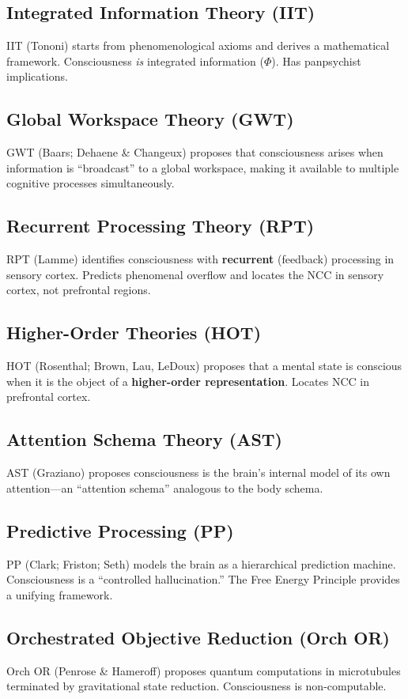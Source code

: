 \documentclass[11pt,a4paper]{report}
\begin{document}
\subsection{Integrated Information Theory (IIT)}
IIT (Tononi) starts from phenomenological axioms and derives a mathematical framework. Consciousness \emph{is} integrated information ($\Phi$). Has panpsychist implications.

\subsection{Global Workspace Theory (GWT)}
GWT (Baars; Dehaene \& Changeux) proposes that consciousness arises when information is ``broadcast'' to a global workspace, making it available to multiple cognitive processes simultaneously.

\subsection{Recurrent Processing Theory (RPT)}
RPT (Lamme) identifies consciousness with \textbf{recurrent} (feedback) processing in sensory cortex. Predicts phenomenal overflow and locates the NCC in sensory cortex, not prefrontal regions.

\subsection{Higher-Order Theories (HOT)}
HOT (Rosenthal; Brown, Lau, LeDoux) proposes that a mental state is conscious when it is the object of a \textbf{higher-order representation}. Locates NCC in prefrontal cortex.

\subsection{Attention Schema Theory (AST)}
AST (Graziano) proposes consciousness is the brain's internal model of its own attention---an ``attention schema'' analogous to the body schema.

\subsection{Predictive Processing (PP)}
PP (Clark; Friston; Seth) models the brain as a hierarchical prediction machine. Consciousness is a ``controlled hallucination.'' The Free Energy Principle provides a unifying framework.

\subsection{Orchestrated Objective Reduction (Orch OR)}
Orch OR (Penrose \& Hameroff) proposes quantum computations in microtubules terminated by gravitational state reduction. Consciousness is non-computable.
\end{document}
